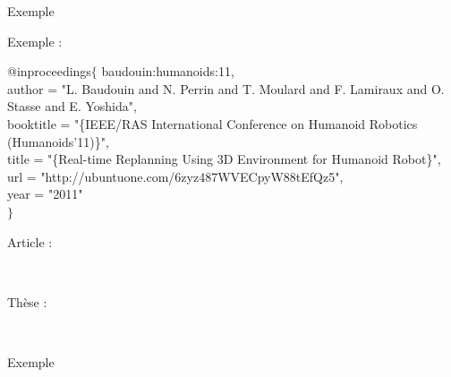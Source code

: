 \documentclass{beamer}
\begin{document}
\begin{frame}{Exemple}

  Exemple :\\
  \vspace{2mm}
  \begin{scriptsize}
    @inproceedings$\lbrace$ baudouin:humanoids:11,\\
    \hspace{5mm} author = "L. Baudouin and N. Perrin and T. Moulard and F. Lamiraux and O. Stasse and E. Yoshida",\\
    \hspace{5mm} booktitle = "\{IEEE/RAS International Conference on Humanoid Robotics (Humanoids'11)\}",\\
    \hspace{5mm} title = "\{Real-time Replanning Using 3D Environment for Humanoid Robot\}",\\
    \hspace{5mm} url = "http://ubuntuone.com/6zyz487WVECpyW88tEfQz5",\\
    \hspace{5mm} year = "2011"\\
    \vspace{-2mm}
    $\rbrace$
  \end{scriptsize}
  \vspace{5mm}

  Article :\\
  \begin{scriptsize}
    \mbox{
      \citeauthor{baudouin:humanoids:11}
      \cite{baudouin:humanoids:11}
    }
  \end{scriptsize}

  Thèse :\\
  \begin{scriptsize}
    \mbox{
      \citeauthor{Courbon09PhD}
      \cite{Courbon09PhD}}
  \end{scriptsize}
  \vspace{5mm}

\end{frame}

\begin{frame}{Exemple}
  \printbibliography[heading=none]
\end{frame}
\end{document}
